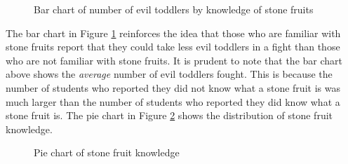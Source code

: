 \documentclass{article}
\begin{document}
\newpage

\begin{figure}[ht]
    \centering
    \caption{Bar chart of number of evil toddlers by knowledge of stone fruits}
    \label{fig:fruitandtoddlers}
\end{figure}

The bar chart in Figure \ref{fig:fruitandtoddlers} reinforces the idea that
those who are familiar with stone fruits report that they could take less evil
toddlers in a fight than those who are not familiar with stone fruits. It is
prudent to note that the bar chart above shows the \textit{average} number of
evil toddlers fought. This is because the number of students who reported they
did not know what a stone fruit is was much larger than the number of students
who reported they did know what a stone fruit is. The pie chart in Figure
\ref{fig:stonefruitpie} shows the distribution of stone fruit knowledge.

\begin{figure}[ht]
    \centering
    \caption{Pie chart of stone fruit knowledge}
    \label{fig:stonefruitpie}
\end{figure}

\newpage
\end{document}

